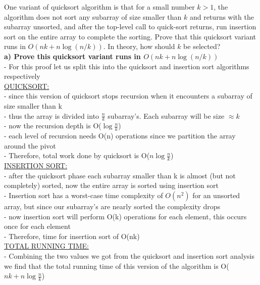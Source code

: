 \documentclass[letterpaper,12pt]{article}
\begin{document}
\begin{enumerate}
One variant of quicksort algorithm is that for a small number $k>1$, the algorithm 
does not sort any subarray of size smaller than $k$ and returns with the subarray
unsorted, and after the top-level call to quick-sort returns, run insertion sort
on the entire array to complete the sorting. Prove that this quicksort variant 
runs in $O(nk+n\log (n/k))$. In theory, how should $k$ be selected? \\
\textbf{a) Prove this quicksort variant runs in $O(nk+n\log (n/k))$} \\
- For this proof let us split this into the quicksort and insertion sort algorithms respectively \\
\underline{QUICKSORT:} \\
- since this version of quicksort stops recursion when it encounters a subarray of size smaller than k \\
- thus the array is divided into \(\frac{n}{k}\) subarray's. Each subarray will be size \(\approx{k}\) \\
- now the recursion depth is O(\(\log{\frac{n}{k}}\)) \\
- each level of recursion needs O(n) operations since we partition the array around the pivot \\
- Therefore, total work done by quicksort is O(\(n\log{\frac{n}{k}}\)) \\
\underline{INSERTION SORT:} \\
- after the quicksort phase each subarray smaller than k is almost (but not completely) sorted, now the entire array is sorted using insertion sort \\
- Insertion sort has a worst-case time complexity of \(O(n^2)\) for an unsorted array, but since our subarray's are nearly sorted the complexity drops \\
- now insertion sort will perform O(k) operations for each element, this occurs once for each element \\
- Therefore, time for insertion sort of O(nk) \\
\underline{TOTAL RUNNING TIME:} \\
- Combining the two values we got from the quicksort and insertion sort analysis we find that the total running time of this version of the algorithm is O(\(nk+n\log{\frac{n}{k}}\)) \\


\end{enumerate}
\end{document}
